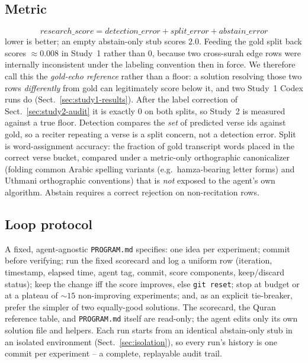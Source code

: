 \documentclass[runningheads]{llncs}
\newcommand{\rscore}{\ensuremath{\mathit{research\_score}}}
\begin{document}
\subsection{Metric}
\begin{equation}
\rscore = \mathit{detection\_error} + \mathit{split\_error} + \mathit{abstain\_error}
\end{equation}
lower is better; an empty abstain-only stub scores $2.0$. Feeding the gold
split back scores $\approx\!0.008$ in Study~1 rather than $0$, because two
cross-surah edge rows were internally inconsistent under the labeling
convention then in force. We therefore call this the \emph{gold-echo
reference} rather than a floor: a solution resolving those two rows
\emph{differently} from gold can legitimately score below it, and two
Study~1 Codex runs do (Sect.~\ref{sec:study1-results}). After the label
correction of Sect.~\ref{sec:study2-audit} it is exactly $0$ on both splits,
so Study~2 is measured against a true floor. Detection compares the
\emph{set} of predicted verse ids against gold, so a reciter repeating a
verse is a split concern, not a detection error. Split is word-assignment
accuracy: the fraction of gold transcript words placed in the correct
verse bucket, compared under a metric-only orthographic canonicalizer (folding
common Arabic spelling variants (e.g.\ hamza-bearing letter forms) and
Uthmani orthographic conventions) that is
\emph{not} exposed to the agent's own algorithm. Abstain requires a correct
rejection on non-recitation rows.

\subsection{Loop protocol}
A fixed, agent-agnostic \texttt{PROGRAM.md} specifies: one idea per
experiment; commit before verifying; run the fixed scorecard and log a
uniform row (iteration, timestamp, elapsed time, agent tag, commit, score
components, keep/discard status); keep the change iff the score improves,
else \texttt{git reset}; stop at budget or at a plateau of $\sim\!15$
non-improving experiments; and, as an explicit tie-breaker, prefer the
simpler of two equally-good solutions. The scorecard, the Quran reference
table, and \texttt{PROGRAM.md} itself are read-only; the agent edits only
its own solution file and helpers. Each run starts from an identical
abstain-only stub in an isolated environment (Sect.~\ref{sec:isolation}),
so every run's history is one commit per experiment -- a complete,
replayable audit trail.
\end{document}

